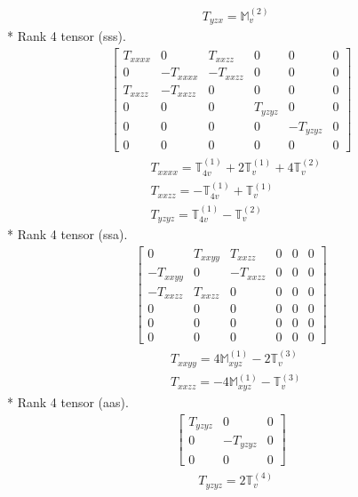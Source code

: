 \documentclass[fleqn,8pt,landscape]{jsarticle}
\begin{document}
\begin{align*}
& T_{yzx} = \mathbb{M}_{v}^{(2)}
\end{align*}
* Rank 4 tensor (sss).
\begin{align*}
\begin{bmatrix} T_{xxxx} & 0 & T_{xxzz} & 0 & 0 & 0 \\ 0 & - T_{xxxx} & - T_{xxzz} & 0 & 0 & 0 \\ T_{xxzz} & - T_{xxzz} & 0 & 0 & 0 & 0 \\ 0 & 0 & 0 & T_{yzyz} & 0 & 0 \\ 0 & 0 & 0 & 0 & - T_{yzyz} & 0 \\ 0 & 0 & 0 & 0 & 0 & 0 \end{bmatrix}
\end{align*}
\begin{align*}
& T_{xxxx} = \mathbb{T}_{4v}^{(1)} + 2 \mathbb{T}_{v}^{(1)} + 4 \mathbb{T}_{v}^{(2)} \\
& T_{xxzz} = - \mathbb{T}_{4v}^{(1)} + \mathbb{T}_{v}^{(1)} \\
& T_{yzyz} = \mathbb{T}_{4v}^{(1)} - \mathbb{T}_{v}^{(2)}
\end{align*}
* Rank 4 tensor (ssa).
\begin{align*}
\begin{bmatrix} 0 & T_{xxyy} & T_{xxzz} & 0 & 0 & 0 \\ - T_{xxyy} & 0 & - T_{xxzz} & 0 & 0 & 0 \\ - T_{xxzz} & T_{xxzz} & 0 & 0 & 0 & 0 \\ 0 & 0 & 0 & 0 & 0 & 0 \\ 0 & 0 & 0 & 0 & 0 & 0 \\ 0 & 0 & 0 & 0 & 0 & 0 \end{bmatrix}
\end{align*}
\begin{align*}
& T_{xxyy} = 4 \mathbb{M}_{xyz}^{(1)} - 2 \mathbb{T}_{v}^{(3)} \\
& T_{xxzz} = - 4 \mathbb{M}_{xyz}^{(1)} - \mathbb{T}_{v}^{(3)}
\end{align*}
* Rank 4 tensor (aas).
\begin{align*}
\begin{bmatrix} T_{yzyz} & 0 & 0 \\ 0 & - T_{yzyz} & 0 \\ 0 & 0 & 0 \end{bmatrix}
\end{align*}
\begin{align*}
& T_{yzyz} = 2 \mathbb{T}_{v}^{(4)}
\end{align*}
\end{document}
